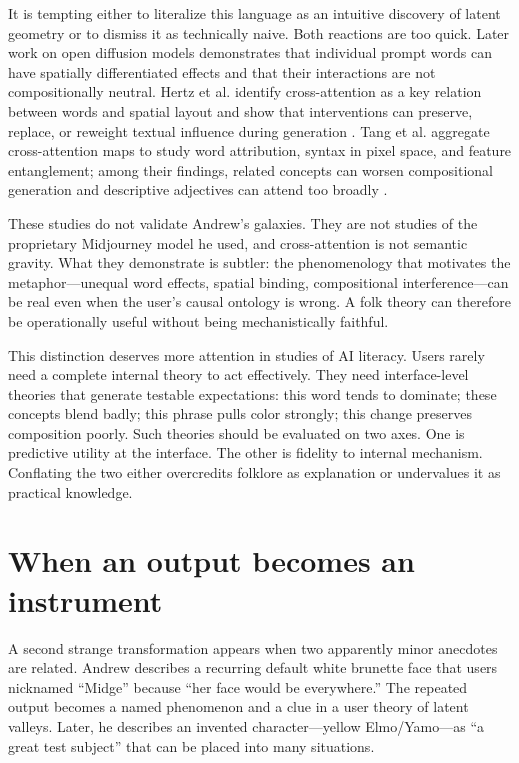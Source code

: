 \documentclass[11pt]{article}
\begin{document}
It is tempting either to literalize this language as an intuitive discovery of latent geometry or to dismiss it as technically naive. Both reactions are too quick. Later work on open diffusion models demonstrates that individual prompt words can have spatially differentiated effects and that their interactions are not compositionally neutral. Hertz et al. identify cross-attention as a key relation between words and spatial layout and show that interventions can preserve, replace, or reweight textual influence during generation \citep{hertz2022prompt}. Tang et al. aggregate cross-attention maps to study word attribution, syntax in pixel space, and feature entanglement; among their findings, related concepts can worsen compositional generation and descriptive adjectives can attend too broadly \citep{tang2023daam}.

These studies do not validate Andrew's galaxies. They are not studies of the proprietary Midjourney model he used, and cross-attention is not semantic gravity. What they demonstrate is subtler: the phenomenology that motivates the metaphor—unequal word effects, spatial binding, compositional interference—can be real even when the user's causal ontology is wrong. A folk theory can therefore be operationally useful without being mechanistically faithful.

This distinction deserves more attention in studies of AI literacy. Users rarely need a complete internal theory to act effectively. They need interface-level theories that generate testable expectations: this word tends to dominate; these concepts blend badly; this phrase pulls color strongly; this change preserves composition poorly. Such theories should be evaluated on two axes. One is predictive utility at the interface. The other is fidelity to internal mechanism. Conflating the two either overcredits folklore as explanation or undervalues it as practical knowledge.

\section{When an output becomes an instrument}
A second strange transformation appears when two apparently minor anecdotes are related. Andrew describes a recurring default white brunette face that users nicknamed ``Midge'' because ``her face would be everywhere.'' The repeated output becomes a named phenomenon and a clue in a user theory of latent valleys. Later, he describes an invented character—yellow Elmo/Yamo—as ``a great test subject'' that can be placed into many situations.
\end{document}
